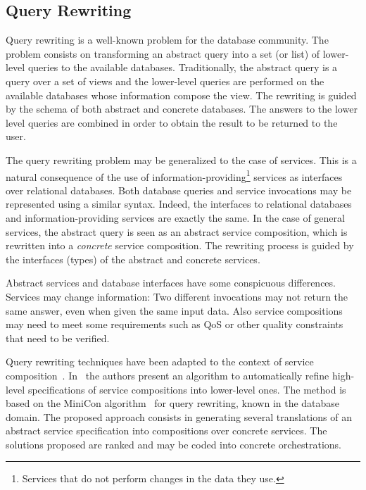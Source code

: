 \subsection{Query Rewriting}
\label{sec:queryRew}


Query rewriting is a well-known problem for the database community.
The problem consists on transforming an abstract query into a set (or list) of lower-level queries to the available databases.
Traditionally, the abstract query is a query over a set of views and the lower-level queries are performed on the available databases whose information compose the view. 
The rewriting is guided by the schema of both abstract and concrete databases.
The answers to the lower level queries are combined in order to obtain the result to be returned to the user.

The query rewriting problem may be generalized to the case of services.
This is a natural consequence of the use of information-providing\footnote{Services that do not perform changes in the data they use.} services as interfaces over relational databases.
Both database queries and service invocations may be represented using a similar syntax.
Indeed, the interfaces to relational databases and information-providing services are exactly the same.
In the case of general services, the abstract query is seen as an abstract service composition, which is rewritten into a \textit{concrete} service composition.
The rewriting process is guided by the interfaces (types) of the abstract and concrete services.

Abstract services and database interfaces have some conspicuous differences.
Services may change information: Two different invocations may not return the same answer, even when given the same input data.
Also service compositions may need to meet some requirements such as QoS or other quality constraints that need to be verified.

Query rewriting techniques have been adapted to the context of service composition~\cite{queryRewriting}. 
In~\cite{UmbertoICWE2013} the authors present an algorithm to automatically refine high-level specifications of service compositions into lower-level ones. 
The method is based on the MiniCon algorithm~\cite{PH01} for query rewriting,  known in the database domain.
The proposed approach consists in generating several translations of an abstract service specification into compositions
over concrete  services. 
The solutions proposed are ranked and may be coded into concrete orchestrations. 


